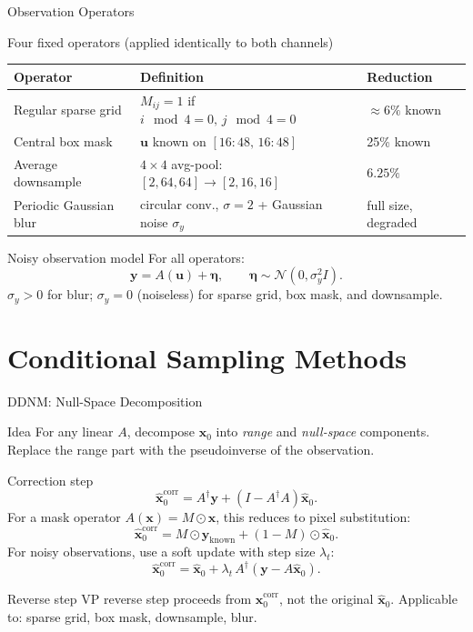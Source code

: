 \documentclass[9pt]{beamer}
\begin{document}
\begin{frame}{Observation Operators}
\begin{block}{Four fixed operators (applied identically to both channels)}
\renewcommand{\arraystretch}{1.3}
\begin{center}
\begin{tabular}{lll}
\toprule
\textbf{Operator} & \textbf{Definition} & \textbf{Reduction} \\
\midrule
Regular sparse grid & $M_{ij}=1$ if $i\!\mod 4=0,\, j\!\mod 4=0$ & $\approx6\%$ known \\
Central box mask & $\mathbf{u}$ known on $[16{:}48,\,16{:}48]$ & 25\% known \\
Average downsample & $4{\times}4$ avg-pool: $[2,64,64]\to[2,16,16]$ & $6.25\%$ \\
Periodic Gaussian blur & circular conv., $\sigma{=}2$ + Gaussian noise $\sigma_y$ & full size, degraded \\
\bottomrule
\end{tabular}
\end{center}
\end{block}
\begin{block}{Noisy observation model}
For all operators:
\[
  \mathbf{y} = A(\mathbf{u}) + \boldsymbol{\eta}, \qquad \boldsymbol{\eta} \sim \mathcal{N}(0, \sigma_y^2 I).
\]
$\sigma_y > 0$ for blur; $\sigma_y = 0$ (noiseless) for sparse grid, box mask, and downsample.
\end{block}
\end{frame}

\section{Conditional Sampling Methods}

\begin{frame}{DDNM: Null-Space Decomposition}
\begin{block}{Idea}
For any linear $A$, decompose $\hat{\mathbf{x}}_0$ into \emph{range} and \emph{null-space} components.
Replace the range part with the pseudoinverse of the observation.
\end{block}
\begin{block}{Correction step}
\[
  \hat{\mathbf{x}}_0^\text{corr} = A^\dagger \mathbf{y} + (I - A^\dagger A)\hat{\mathbf{x}}_0.
\]
For a mask operator $A(\mathbf{x}) = M \odot \mathbf{x}$, this reduces to pixel substitution:
\[
  \hat{\mathbf{x}}_0^\text{corr} = M \odot \mathbf{y}_\text{known} + (1-M)\odot\hat{\mathbf{x}}_0.
\]
For noisy observations, use a soft update with step size $\lambda_t$:
\[
  \hat{\mathbf{x}}_0^\text{corr} = \hat{\mathbf{x}}_0 + \lambda_t\,A^\dagger(\mathbf{y} - A\hat{\mathbf{x}}_0).
\]
\end{block}
\begin{block}{Reverse step}
VP reverse step proceeds from $\hat{\mathbf{x}}_0^\text{corr}$, not the original $\hat{\mathbf{x}}_0$.
Applicable to: sparse grid, box mask, downsample, blur.
\end{block}
\end{frame}
\end{document}
